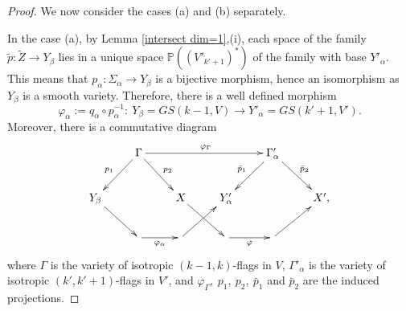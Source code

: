 \documentclass[12pt]{amsart}
\renewcommand{\phi}{\varphi}
\theoremstyle{definition}
\begin{document}
\begin{proof}
We now consider the cases (a) and (b) separately.

In the case (a), by Lemma \ref{intersect dim=1},(i), each space of the family $\tilde{p}:\tilde{Z}\to Y_{\beta}$ lies
in a unique space $\mathbb{P}((V'_{k'+1})^*)$ of the family with base $Y'_{\alpha}$. This
means that $p_{\alpha}:\Sigma_{\alpha}\to Y_{\beta}$ is a bijective morphism, hence an isomorphism as $Y_{\beta}$ is a
smooth variety. Therefore, there is a well defined morphism
\begin{equation}\label{mor i}
\phi_{\alpha}:=q_{\alpha}\circ p_{\alpha}^{-1}:\ Y_{\beta}=GS(k-1,V)\to Y'_{\alpha}=GS(k'+1,V').
\end{equation}
Moreover, there is a commutative diagram
\begin{equation}\label{phi Y^2}
\xymatrix{
& \Gamma\ar[rrr]^{\phi_{\Gamma}}\ar[dl]_{p_1}\ar[dr]^{p_2} &&& \Gamma'_{\alpha}\ar[dl]_{\bar{p}_1}\ar[dr]^{\bar{p}_2}& \\
Y_{\beta}\ar[dr]&& X\ar[dr]& Y'_{\alpha} && X',\\
&\ar[r]_{\phi_{\alpha}}&\ar[ur]&\ar[r]_{\phi}&\ar[ur]& }
\end{equation}
where $\Gamma$ is the variety of isotropic $(k-1,k)$-flags in $V$,
$\Gamma'_{\alpha}$ is the variety of isotropic $(k',k'+1)$-flags in $V'$,
and $\phi_\Gamma,\ p_1,\ p_2,\ \bar{p}_1$ and $\bar{p}_2$ are the induced projections.


\end{proof}
\end{document}
